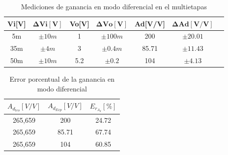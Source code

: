 \begin{enumerate}
        \begin{table}[H]
          \centering
          \begin{tabular}{|c|c|c|c|c|c|c|}
            \hline
            \textbf{Vi[V]} & $\mathbf{\Delta Vi[V]}$ & \textbf{Vo[V]} & $\mathbf{\Delta Vo[V]}$ & \textbf{Ad[V/V]} & $\mathbf{\Delta Ad[V/V]}$ \\ \hline
            5m             & $\pm 10m$               & 1              & $\pm 100m$              & 200              & $\pm 20.01$               \\ \hline
            35m            & $\pm 4m$                & 3              & $\pm 0.4m$              & 85.71            & $\pm 11.43$               \\ \hline
            50m            & $\pm 10m$               & 5.2            & $\pm 0.2$               & 104              & $\pm 4.13$                \\ \hline
          \end{tabular}
          \caption{Mediciones de ganancia en modo diferencial en el multietapas}
          \label{tab:ganancia_multietapas}
        \end{table}

        \begin{table}[H]
          \centering
          \begin{tabular}{|c|c|c|}
            \hline
            $A_{d_{teo}} [V/V]$ & $A_{d_{Exp}} [V/V]$ & $E_{r_{A_d}} [\%]$ \\
            \hline
            265,659             & 200                 & 24.72              \\
            \hline
            265,659             & 85.71               & 67.74              \\
            \hline
            265,659             & 104                 & 60.85              \\
            \hline
          \end{tabular}
          \caption{Error porcentual de la ganancia en modo diferencial}
          \label{tab:error_porcentual_ganancia_diferencial}
        \end{table}




\end{enumerate}
